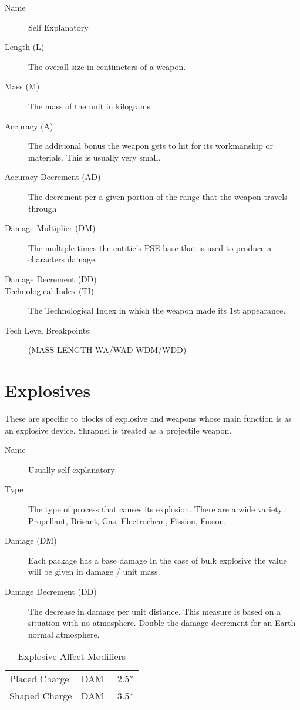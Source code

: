 \begin{description}
	\item[Name]
	Self Explanatory
	\item[Length (L)]
	The overall size in centimeters of a weapon.
	\item[Mass (M)]
	The mass of the unit in kilograms
	\item[Accuracy (A)]
	The additional bonus the weapon gets to hit for its workmanship or
	materials. This is usually very small.
	\item[Accuracy Decrement (AD)]
	The decrement per a given portion of the range that the weapon travels through
	\item[Damage Multiplier (DM)]
	The multiple times the entitie's PSE base that is used to produce a characters
	damage.
	\item[Damage Decrement (DD)]
	\item[Technological Index (TI)]
	The Technological Index in which the weapon made its 1st appearance.
	\item[Tech Level Breakpoints:]
	(MASS-LENGTH-WA/WAD-WDM/WDD)
\end{description}

\clearpage
\section{Explosives}

These are specific to blocks of explosive and weapons whose main 
function is as an explosive device. Shrapnel is treated as a
projectile weapon.

\begin{description}
	\item[Name]
	Usually self explanatory
	\item[Type ]
	The type of process that causes its explosion. There are a wide 
	variety : Propellant, Brisant, Gas, Electrochem, Fission, Fusion.
	\item[Damage (DM)]
	Each package has a base damage In the case of bulk explosive the value
	will be given in damage / unit mass. 
	\item[Damage Decrement (DD)]
	The decrease in damage per unit distance. This measure is based on 
	a situation with no atmosphere. Double the damage decrement for an 
	Earth normal atmosphere. 
\end{description}

\begin{table}[h]
\centering
\caption{Explosive Affect Modifiers}
	\begin{tabular}{ll} \hline
		Placed Charge  & DAM = 2.5* \\
		Shaped Charge  & DAM = 3.5* \\ \hline
	\end{tabular}
\end{table}



